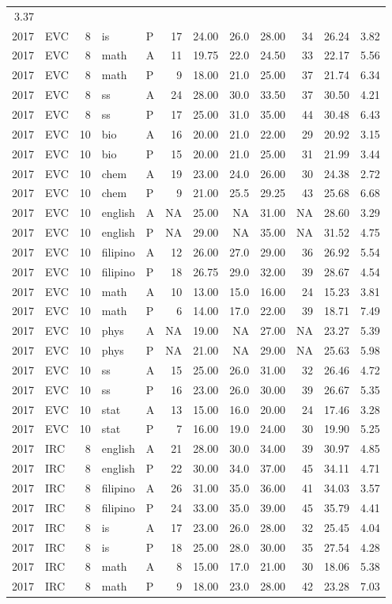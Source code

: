 \documentclass[]{article}
\begin{document}
\begin{longtable}[]{@{}rlrllrrrrrrr@{}}
3.37\tabularnewline
2017 & EVC & 8 & is & P & 17 & 24.00 & 26.0 & 28.00 & 34 & 26.24 &
3.82\tabularnewline
2017 & EVC & 8 & math & A & 11 & 19.75 & 22.0 & 24.50 & 33 & 22.17 &
5.56\tabularnewline
2017 & EVC & 8 & math & P & 9 & 18.00 & 21.0 & 25.00 & 37 & 21.74 &
6.34\tabularnewline
2017 & EVC & 8 & ss & A & 24 & 28.00 & 30.0 & 33.50 & 37 & 30.50 &
4.21\tabularnewline
2017 & EVC & 8 & ss & P & 17 & 25.00 & 31.0 & 35.00 & 44 & 30.48 &
6.43\tabularnewline
2017 & EVC & 10 & bio & A & 16 & 20.00 & 21.0 & 22.00 & 29 & 20.92 &
3.15\tabularnewline
2017 & EVC & 10 & bio & P & 15 & 20.00 & 21.0 & 25.00 & 31 & 21.99 &
3.44\tabularnewline
2017 & EVC & 10 & chem & A & 19 & 23.00 & 24.0 & 26.00 & 30 & 24.38 &
2.72\tabularnewline
2017 & EVC & 10 & chem & P & 9 & 21.00 & 25.5 & 29.25 & 43 & 25.68 &
6.68\tabularnewline
2017 & EVC & 10 & english & A & NA & 25.00 & NA & 31.00 & NA & 28.60 &
3.29\tabularnewline
2017 & EVC & 10 & english & P & NA & 29.00 & NA & 35.00 & NA & 31.52 &
4.75\tabularnewline
2017 & EVC & 10 & filipino & A & 12 & 26.00 & 27.0 & 29.00 & 36 & 26.92
& 5.54\tabularnewline
2017 & EVC & 10 & filipino & P & 18 & 26.75 & 29.0 & 32.00 & 39 & 28.67
& 4.54\tabularnewline
2017 & EVC & 10 & math & A & 10 & 13.00 & 15.0 & 16.00 & 24 & 15.23 &
3.81\tabularnewline
2017 & EVC & 10 & math & P & 6 & 14.00 & 17.0 & 22.00 & 39 & 18.71 &
7.49\tabularnewline
2017 & EVC & 10 & phys & A & NA & 19.00 & NA & 27.00 & NA & 23.27 &
5.39\tabularnewline
2017 & EVC & 10 & phys & P & NA & 21.00 & NA & 29.00 & NA & 25.63 &
5.98\tabularnewline
2017 & EVC & 10 & ss & A & 15 & 25.00 & 26.0 & 31.00 & 32 & 26.46 &
4.72\tabularnewline
2017 & EVC & 10 & ss & P & 16 & 23.00 & 26.0 & 30.00 & 39 & 26.67 &
5.35\tabularnewline
2017 & EVC & 10 & stat & A & 13 & 15.00 & 16.0 & 20.00 & 24 & 17.46 &
3.28\tabularnewline
2017 & EVC & 10 & stat & P & 7 & 16.00 & 19.0 & 24.00 & 30 & 19.90 &
5.25\tabularnewline
2017 & IRC & 8 & english & A & 21 & 28.00 & 30.0 & 34.00 & 39 & 30.97 &
4.85\tabularnewline
2017 & IRC & 8 & english & P & 22 & 30.00 & 34.0 & 37.00 & 45 & 34.11 &
4.71\tabularnewline
2017 & IRC & 8 & filipino & A & 26 & 31.00 & 35.0 & 36.00 & 41 & 34.03 &
3.57\tabularnewline
2017 & IRC & 8 & filipino & P & 24 & 33.00 & 35.0 & 39.00 & 45 & 35.79 &
4.41\tabularnewline
2017 & IRC & 8 & is & A & 17 & 23.00 & 26.0 & 28.00 & 32 & 25.45 &
4.04\tabularnewline
2017 & IRC & 8 & is & P & 18 & 25.00 & 28.0 & 30.00 & 35 & 27.54 &
4.28\tabularnewline
2017 & IRC & 8 & math & A & 8 & 15.00 & 17.0 & 21.00 & 30 & 18.06 &
5.38\tabularnewline
2017 & IRC & 8 & math & P & 9 & 18.00 & 23.0 & 28.00 & 42 & 23.28 &
7.03\tabularnewline

\end{longtable}
\end{document}
